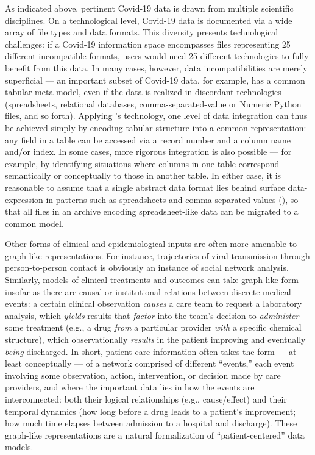 \documentclass[11pt,letterpaper]{article}
\newcommand{\textscc}[1]{{\color{orr!35!black}{{%
						\fontfamily{Cabin-TLF}\fontseries{b}\selectfont{\textsc{\scriptsize{#1}}}}}}}
\newcommand{\AcronymText}[1]{{\textscc{#1}}}
\newcommand{\CSV}{{\resizebox{!}{7pt}{\AcronymText{CSV}}}}
\newcommand{\CRtwo}{{\resizebox{!}{7pt}{\AcronymText{CR2}}}}
\newcommand{\p}[1]{

\vspace{.6em}#1}
\newcommand{\q}[1]{{\fontfamily{qcr}\selectfont ``}#1{\fontfamily{qcr}\selectfont ''}}
\begin{document}
{\p{As indicated above, pertinent Covid-19 data is drawn 
from multiple scientific disciplines.  On a technological level, 
Covid-19 data is documented via a wide array of file 
types and data formats.  This diversity presents technological 
challenges: if a Covid-19 information space encompasses 
files representing 25 different incompatible 
formats, users would need 25 different technologies 
to fully benefit from this data.  In many 
cases, however, data incompatibilities are 
merely superficial --- an important subset of 
Covid-19 data, for example, has a common 
tabular meta-model, even if the data is 
realized in discordant technologies (spreadsheets, 
relational databases, comma-separated-value or 
Numeric Python files, and so forth).  Applying \CRtwo{}'s technology, 
one level of data integration can thus 
be achieved simply by encoding tabular 
structure into a common representation: any field in a table 
can be accessed via a record number and a column name and/or 
index.  In some cases, more rigorous integration is also 
possible --- for example, by identifying situations where 
columns in one table correspond semantically or conceptually 
to those in another table.  In either case, 
it is reasonable to assume that a single abstract data 
format lies behind surface data-expression in patterns 
such as spreadsheets and comma-separated values 
(\CSV{}), so that all files in an 
archive encoding spreadsheet-like data can be 
migrated to a common model.}

\p{Other forms of clinical and epidemiological inputs are often 
more amenable to graph-like representations.  For instance, 
trajectories of viral transmission through 
person-to-person contact is obviously an instance 
of social network analysis.  Similarly, models of 
clinical treatments and outcomes can take graph-like 
form insofar as there are causal or institutional 
relations between discrete medical events: 
a certain clinical observation \textit{causes} a 
care team to request a laboratory analysis, 
which \textit{yields} results that \textit{factor} 
into the team's decision to \textit{administer} some 
treatment (e.g., a drug \textit{from} a particular 
provider \textit{with} a specific chemical structure), which 
observationally \textit{results} in the patient improving 
and eventually \textit{being} discharged.  In short, 
patient-care information often takes the form 
--- at least conceptually --- of a network comprised 
of different \q{events,} each event involving some 
observation, action, intervention, or decision made 
by care providers, and where the important data 
lies in how the events are interconnected: both their 
logical relationships (e.g., cause/effect) and their 
temporal dynamics (how long before a drug leads to a 
patient's improvement; how much time elapses between admission to 
a hospital and discharge).  These graph-like representations 
are a natural formalization of \q{patient-centered} data 
models.}

}
\end{document}
